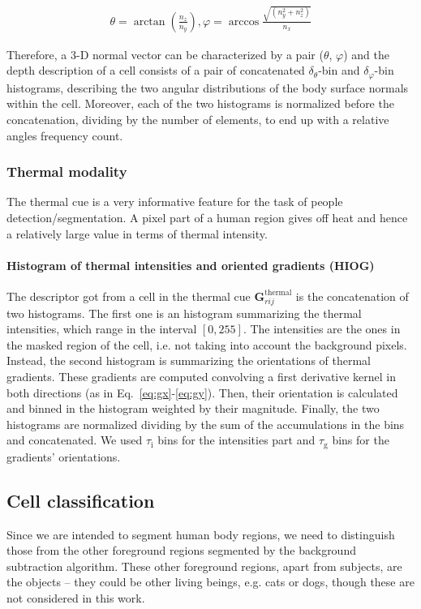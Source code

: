 \documentclass[10pt,twocolumn,letterpaper]{article}
\begin{document}
\begin{gather}	
	\theta  = \arctan{\left( \frac{n_z}{n_y} \right)},
	\varphi = \arccos{\frac{ \sqrt{(n_y^2 + n_z^2)} }{n_x}}
\end{gather}

Therefore, a 3-D normal vector can be characterized by a pair ($\theta$, $\varphi$) and the depth description of a cell consists of a pair of concatenated $\delta_\theta$-bin and $\delta_\varphi$-bin histograms, describing the two angular distributions of the body surface normals within the cell. Moreover, each of the two histograms is normalized before the concatenation, dividing by the number of elements, to end up with a relative angles frequency count.

\subsubsection{Thermal modality}
\label{sssec:thermal}

The thermal cue is a very informative feature for the task of people detection/segmentation. A pixel part of a human region gives off heat and hence a relatively large value in terms of thermal intensity.

\paragraph{Histogram of thermal intensities and oriented gradients (HIOG)} 
The descriptor got from a cell in the thermal cue $\mathbf{G}_{rij}^{\mathrm{thermal}}$ is the concatenation of two histograms. The first one is an histogram summarizing the thermal intensities, which range in the interval $[0, 255]$. The intensities are the ones in the masked region of the cell, i.e. not taking into account the background pixels. Instead, the second histogram is summarizing the orientations of thermal gradients. These gradients are computed convolving a first derivative kernel in both directions (as in Eq.~\ref{eq:gx}-\ref{eq:gy}). Then, their orientation is calculated and binned in the histogram weighted by their magnitude. Finally, the two histograms are normalized dividing by the sum of the accumulations in the bins and concatenated. We used $\tau_{\mathrm{i}}$ bins for the intensities part and $\tau_{\mathrm{g}}$ bins for the gradients' orientations.

\subsection{Cell classification}
Since we are intended to segment human body regions, we need to distinguish those from the other foreground regions segmented by the background subtraction algorithm. These other foreground regions, apart from subjects, are the objects -- they could be other living beings, e.g. cats or dogs, though these are not considered in this work.
\end{document}
